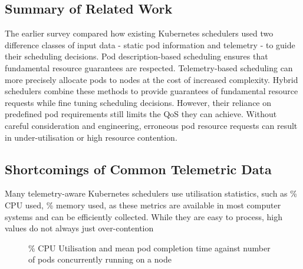 %
%
%

\subsection{Summary of Related Work}
The earlier survey compared how existing Kubernetes schedulers used two
difference classes of input data - static pod information and telemetry - to
guide their scheduling decisions. Pod description-based scheduling ensures that
fundamental resource guarantees are respected. Telemetry-based scheduling can
more precisely allocate pods to nodes at the cost of increased complexity.
Hybrid schedulers combine these methods to provide guarantees of fundamental
resource requests while fine tuning scheduling decisions. However, their
reliance on predefined pod requirements still limits the QoS they can achieve.
Without careful consideration and engineering, erroneous pod resource requests
can result in under-utilisation or high resource contention.

\subsection{Shortcomings of Common Telemetric Data}

Many telemetry-aware Kubernetes schedulers \cite{} use utilisation statistics,
such as \% CPU used, \% memory used, as these metrics are available in most
computer systems and can be efficiently collected. While they are easy to
process, high values do not always just over-contention

\begin{figure}
    \caption{\% CPU Utilisation and mean pod completion time against number of
    pods concurrently running on a node}
    \label{contention}
\end{figure}

